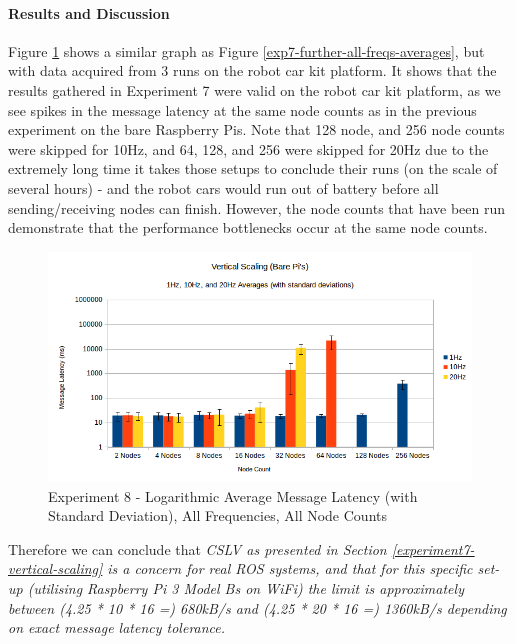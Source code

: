 \documentclass[../dissertation.tex]{subfiles}
\begin{document}
\paragraph{Results and Discussion} Figure \ref{exp8-all-freqs-averages} shows a similar graph as Figure \ref{exp7-further-all-freqs-averages}, but with data acquired from 3 runs on the robot car kit platform. It shows that the results gathered in Experiment 7 were valid on the robot car kit platform, as we see spikes in the message latency at the same node counts as in the previous experiment on the bare Raspberry Pis. Note that 128 node, and 256 node counts were skipped for 10Hz, and 64, 128, and 256 were skipped for 20Hz due to the extremely long time it takes those setups to conclude their runs (on the scale of several hours) - and the robot cars would run out of battery before all sending/receiving nodes can finish. However, the node counts that have been run demonstrate that the performance bottlenecks occur at the same node counts.

\begin{figure}[H]
\centering
\includegraphics[width=\textwidth]{images/experiment9/vertical_scaling_all_freqs_log_avg_msg_latency.png}
\caption{Experiment 8 - Logarithmic Average Message Latency (with Standard Deviation), All Frequencies, All Node Counts}
\label{exp8-all-freqs-averages}
\end{figure}

Therefore we can conclude that \textit{CSLV as presented in Section \ref{experiment7-vertical-scaling} is a concern for real ROS systems, and that for this specific set-up (utilising Raspberry Pi 3 Model Bs on WiFi) the limit is approximately between (4.25 * 10 * 16 =) 680kB/s and (4.25 * 20 * 16 =) 1360kB/s depending on exact message latency tolerance.}
\end{document}
